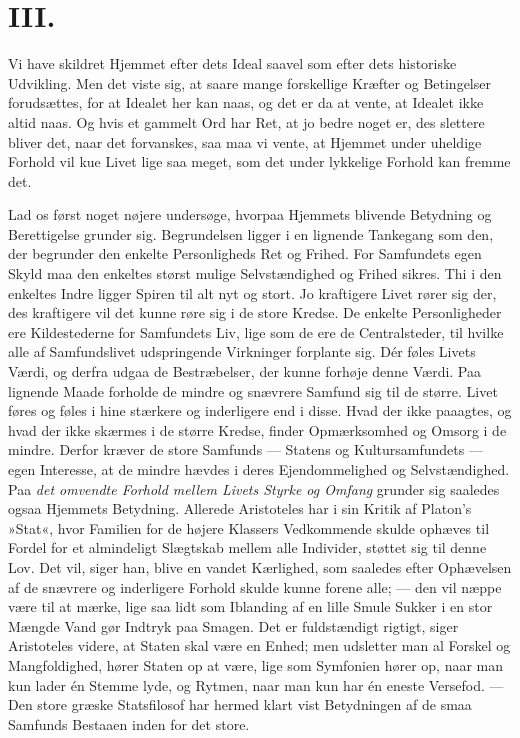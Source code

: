 \documentclass[12pt,a4paper]{article}
\newcommand{\opage}[1]{\marginnote{\footnotesize\textit{[#1]}}}
\begin{document}
\section*{III.}

\noindent \opage{7}Vi have skildret Hjemmet efter dets Ideal saavel som efter dets
historiske Udvikling. Men det viste sig, at saare mange forskellige Kræfter og
Betingelser forudsættes, for at Idealet her kan naas, og det er da at vente,
at Idealet ikke altid naas. Og hvis et gammelt Ord har Ret, at jo bedre noget
er, des slettere bliver det, naar det forvanskes, saa maa vi vente, at Hjemmet
under uheldige Forhold vil kue Livet lige saa meget, som det under lykkelige
Forhold kan fremme det.

Lad os først noget nøjere undersøge, hvorpaa Hjemmets blivende Betydning og
Berettigelse grunder sig. Begrundelsen ligger i en lignende Tankegang som den,
der begrunder den enkelte Personligheds Ret og Frihed. For Samfundets egen
Skyld maa den enkeltes størst mulige Selvstændighed og Frihed sikres. Thi i
den enkeltes Indre ligger Spiren til alt nyt og stort. Jo kraftigere Livet
rører sig der, des kraftigere vil det kunne røre sig i de store Kredse. De
enkelte Personligheder ere Kildestederne for Samfundets Liv, lige som de ere
de Centralsteder, til hvilke alle af Samfundslivet udspringende Virkninger
forplante sig. Dér føles Livets Værdi, og derfra udgaa de Bestræbelser, der
kunne forhøje denne Værdi. Paa lignende Maade forholde de mindre og snævrere
Samfund sig til de større. Livet føres og føles i hine stærkere og inderligere
end i disse. Hvad der ikke paaagtes, og hvad der ikke skærmes i de større
Kredse, finder Opmærksomhed og Omsorg i de mindre. Derfor kræver de store
Samfunds --- Statens og Kultursamfundets --- egen Interesse, at de mindre
hævdes i deres Ejendommelighed og Selvstændighed. Paa \emph{det omvendte Forhold
mellem Livets Styrke og Omfang} grunder sig saaledes ogsaa Hjemmets Betydning.
Allerede Aristoteles har i sin Kritik af Platon's »Stat«, hvor Familien for de
højere Klassers Vedkommende skulde ophæves til Fordel for et almindeligt
Slægtskab mellem alle Individer, støttet sig til denne Lov. Det vil, siger
han, blive en vandet Kærlighed, som saaledes efter Ophævelsen af de snævrere
og inderligere Forhold skulde kunne forene alle; --- den vil næppe være til at
mærke, lige saa lidt som Iblanding af en lille Smule Sukker i en stor Mængde
Vand gør Indtryk paa Smagen. Det er fuldstændigt rigtigt, siger Aristoteles
videre, at Staten skal være en Enhed; men udsletter man al Forskel og
Mangfoldighed, hører Staten op at være, lige som Symfonien hører op, naar man
kun lader én Stemme lyde, og Rytmen, naar man kun har én eneste Versefod. ---
Den store græske Statsfilosof har hermed klart vist Betydningen af de smaa
Samfunds Bestaaen inden for det store.
\end{document}
